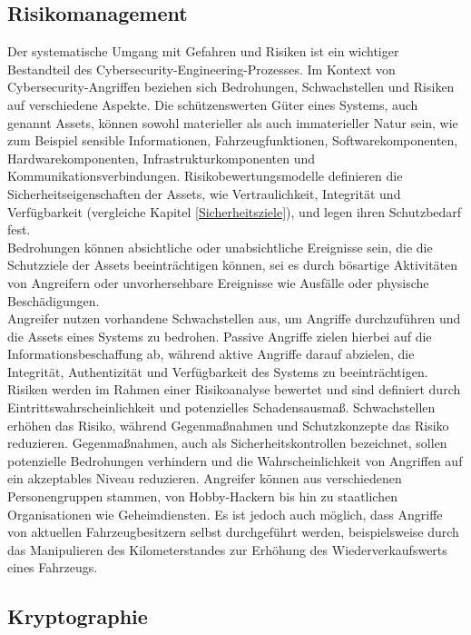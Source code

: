 \subsection{Risikomanagement}
Der systematische Umgang mit Gefahren und Risiken ist ein wichtiger Bestandteil des Cybersecurity-Engineering-Prozesses. Im Kontext von Cybersecurity-Angriffen beziehen sich Bedrohungen, Schwachstellen und Risiken auf verschiedene Aspekte. Die schützenswerten Güter eines Systems, auch genannt Assets, können sowohl materieller als auch immaterieller Natur sein, wie zum Beispiel sensible Informationen, Fahrzeugfunktionen, Softwarekomponenten, Hardwarekomponenten, Infrastrukturkomponenten und Kommunikationsverbindungen. Risikobewertungsmodelle definieren die Sicherheitseigenschaften der Assets, wie Vertraulichkeit, Integrität und Verfügbarkeit (vergleiche Kapitel \ref{Sicherheitsziele}), und legen ihren Schutzbedarf fest. \cite[5]{Wurm.2022}\\
Bedrohungen können absichtliche oder unabsichtliche Ereignisse sein, die die Schutzziele der Assets beeinträchtigen können, sei es durch bösartige Aktivitäten von Angreifern oder unvorhersehbare Ereignisse wie Ausfälle oder physische Beschädigungen. \\
Angreifer nutzen vorhandene Schwachstellen aus, um Angriffe durchzuführen und die Assets eines Systems zu bedrohen. Passive Angriffe zielen hierbei auf die Informationsbeschaffung ab, während aktive Angriffe darauf abzielen, die Integrität, Authentizität und Verfügbarkeit des Systems zu beeinträchtigen. \\
Risiken werden im Rahmen einer Risikoanalyse bewertet und sind definiert durch Eintrittswahrscheinlichkeit und potenzielles Schadensausmaß. Schwachstellen erhöhen das Risiko, während Gegenmaßnahmen und Schutzkonzepte das Risiko reduzieren. Gegenmaßnahmen, auch als Sicherheitskontrollen bezeichnet, sollen potenzielle Bedrohungen verhindern und die Wahrscheinlichkeit von Angriffen auf ein akzeptables Niveau reduzieren. Angreifer können aus verschiedenen Personengruppen stammen, von Hobby-Hackern bis hin zu staatlichen Organisationen wie Geheimdiensten. Es ist jedoch auch möglich, dass Angriffe von aktuellen Fahrzeugbesitzern selbst durchgeführt werden, beispielsweise durch das Manipulieren des Kilometerstandes zur Erhöhung des Wiederverkaufswerts eines Fahrzeugs. \cite[5\psq]{Wurm.2022}



\subsection{Kryptographie}


